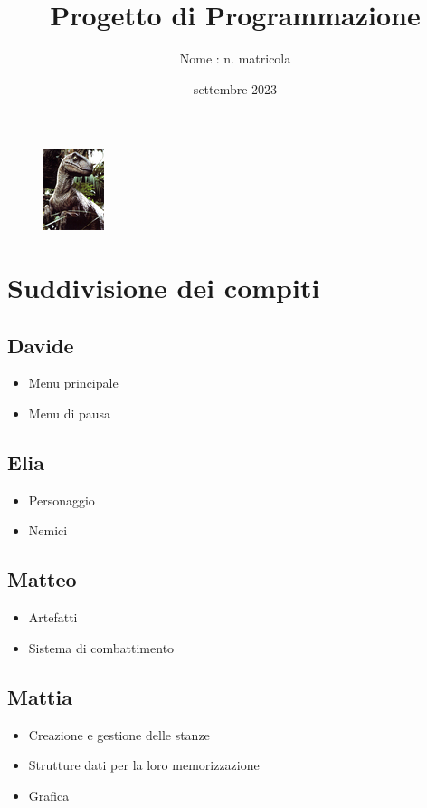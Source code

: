 \documentclass[12pt]{article}
\title{Progetto di Programmazione}
\author{Nome : n. matricola}
\date{settembre 2023}
\begin{document}
\maketitle

\begin{figure}[h]
    \centering
    \includegraphics{raptor.jpg}
\end{figure}

\newpage


\section*{Suddivisione dei compiti}
\subsection*{Davide}
\begin{itemize}
    \item Menu principale
    \item Menu di pausa
\end{itemize}
 
\subsection*{Elia}
\begin{itemize}
    \item Personaggio 
    \item Nemici
\end{itemize}

\subsection*{Matteo}
\begin{itemize}
    \item Artefatti
    \item Sistema di combattimento
\end{itemize}

\subsection*{Mattia}
\begin{itemize}
    \item Creazione e gestione delle stanze 
    \item Strutture dati per la loro memorizzazione
    \item Grafica
\end{itemize}
\end{document}
